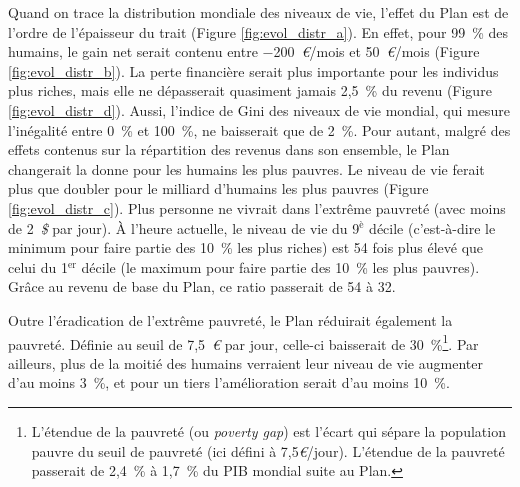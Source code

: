 \documentclass[a5paper,french,openany]{memoir}
\begin{document}


Quand on trace la distribution mondiale des niveaux de vie, l'effet du Plan est de l'ordre de l'épaisseur du trait (Figure \ref{fig:evol_distr_a}). En effet, pour 99~\% des humains, le gain net serait contenu entre $-$200~\textit{\euro{}}/mois et 50~\textit{\euro{}}/mois (Figure \ref{fig:evol_distr_b}). La perte financière serait plus importante pour les individus plus riches, mais elle ne dépasserait quasiment jamais 2,5~\% du revenu (Figure \ref{fig:evol_distr_d}). Aussi, l'indice de Gini des niveaux de vie mondial, qui mesure l'inégalité entre 0~\% et 100~\%, ne baisserait que de 2~\%. 
Pour autant, malgré des effets contenus sur la répartition des revenus dans son ensemble, le Plan changerait la donne pour les humains les plus pauvres. Le niveau de vie ferait plus que doubler pour le milliard d'humains les plus pauvres (Figure \ref{fig:evol_distr_c}). Plus personne ne vivrait dans l'extrême pauvreté (avec moins de 2~\textit{\$} par jour). 
À l'heure actuelle, le niveau de vie du 9$^\text{è}$ décile (c'est-à-dire le minimum pour faire partie des 10~\% les plus riches) est 54 fois plus élevé que celui du 1$^\text{er}$ décile (le maximum pour faire partie des 10~\% les plus pauvres). Grâce au revenu de base du Plan, ce ratio passerait de 54 à 32. 

Outre l'éradication de l'extrême pauvreté, le Plan réduirait également la pauvreté. Définie au seuil de 7,5~\textit{\euro{}} par jour, %
celle-ci baisserait de 30~\%\footnote{L'étendue de la pauvreté (ou \textit{poverty gap}) est l'écart qui sépare la population pauvre du seuil de pauvreté (ici défini à 7,5\textit{\euro{}}/jour). L'étendue de la pauvreté passerait de 2,4~\% à 1,7~\% du PIB mondial suite au Plan.}. 
Par ailleurs, plus de la moitié des humains verraient leur niveau de vie augmenter d'au moins 3~\%, et pour un tiers l'amélioration serait d'au moins 10~\%. 
\end{document}
